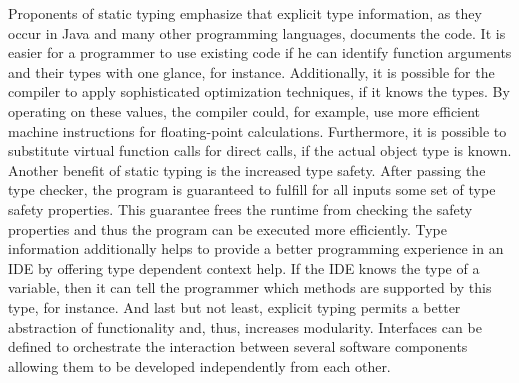 Proponents of static typing emphasize that explicit type information, as they occur in Java and many other programming languages, documents the code.
It is easier for a programmer to use existing code if he can identify function arguments and their types with one glance, for instance. 
Additionally, it is possible for the compiler to apply sophisticated optimization techniques, if it knows the types.
By operating on these values, the compiler could, for example, use more efficient machine instructions for floating-point calculations.
Furthermore, it is possible to substitute virtual function calls for direct calls, if the actual object type is known.
Another benefit of static typing is the increased type safety.
After passing the type checker, the program is guaranteed to fulfill for all inputs some set of type safety properties.
This guarantee frees the runtime from checking the safety properties and thus the program can be executed more efficiently.
Type information additionally helps to provide a better programming experience in an IDE by offering type dependent context help.
If the IDE knows the type of a variable, then it can tell the programmer which methods are supported by this type, for instance.
And last but not least, explicit typing permits a better abstraction of functionality and, thus, increases modularity.
Interfaces can be defined to orchestrate the interaction between several software components allowing them to be developed independently from each other.

